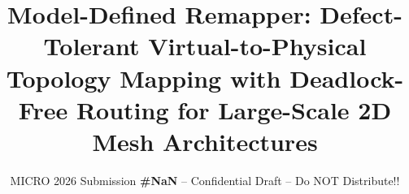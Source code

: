 \documentclass[sigconf, screen, review]{acmart}
\begin{document}
\title{Model-Defined Remapper: Defect-Tolerant Virtual-to-Physical Topology Mapping with Deadlock-Free Routing for Large-Scale 2D Mesh Architectures}
\subtitle{\normalsize{MICRO 2026 Submission
    \textbf{\#NaN} -- Confidential Draft -- Do NOT Distribute!!}}

\begin{abstract}

%
%
%

\end{abstract}


\maketitle
\end{document}
